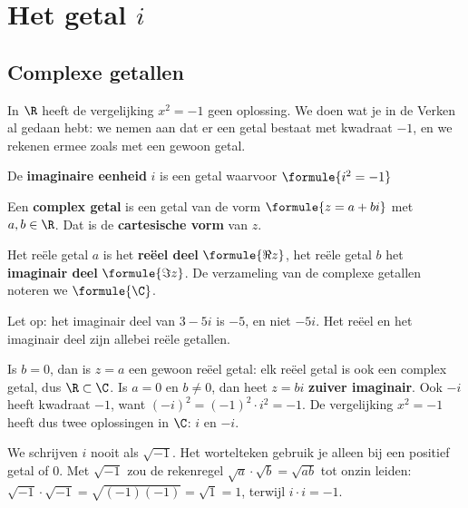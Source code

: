 \section{Het getal \texorpdfstring{$i$}{i}}

\subsection{Complexe getallen}

In $\R$ heeft de vergelijking $x^2 = -1$ geen oplossing. We doen wat je in de Verken al gedaan hebt: we nemen aan dat er een getal bestaat met kwadraat $-1$, en we rekenen ermee zoals met een gewoon getal.

\begin{theorie}
De \textbf{\textcolor{accent}{imaginaire eenheid}} $i$ is een getal waarvoor \quad $\formule{i^2 = -1}$

\vspace{1mm}
Een \textbf{\textcolor{accent}{complex getal}} is een getal van de vorm \quad $\formule{z = a + bi}$ \quad met $a, b \in \R$. Dat is de \textbf{\textcolor{accent}{cartesische vorm}} van $z$.

\vspace{1mm}
Het reële getal $a$ is het \textbf{\textcolor{accent}{reëel deel}} $\formule{\Re z}$, het reële getal $b$ het \textbf{\textcolor{accent}{imaginair deel}} $\formule{\Im z}$.
De verzameling van de complexe getallen noteren we $\formule{\C}$.
\end{theorie}

Let op: het imaginair deel van $3 - 5i$ is $-5$, en niet $-5i$. Het reëel en het imaginair deel zijn allebei reële getallen.

Is $b = 0$, dan is $z = a$ een gewoon reëel getal: elk reëel getal is ook een complex getal, dus $\R \subset \C$. Is $a = 0$ en $b \neq 0$, dan heet $z = bi$ \textbf{zuiver imaginair}. Ook $-i$ heeft kwadraat $-1$, want $(-i)^2 = (-1)^2 \cdot i^2 = -1$. De vergelijking $x^2 = -1$ heeft dus twee oplossingen in $\C$: $i$ en $-i$.

We schrijven $i$ nooit als $\sqrt{-1}$. Het wortelteken gebruik je alleen bij een positief getal of 0. Met $\sqrt{-1}$ zou de rekenregel $\sqrt{a} \cdot \sqrt{b} = \sqrt{ab}$ tot onzin leiden: $\sqrt{-1} \cdot \sqrt{-1} = \sqrt{(-1)(-1)} = \sqrt{1} = 1$, terwijl $i \cdot i = -1$.

